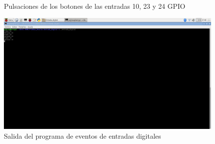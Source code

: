 \begin{itemize}
    
    \begin{figure}[htbp]
    \centering
    \caption{Pulsaciones de los botones de las entradas 10, 23 y 24 GPIO}
    \end{figure}
    
    \begin{figure}
    \centering
    \includegraphics[scale = 0.25]{anexo_a/figuras_dir/res1.jpg}
    \caption{Salida del programa de eventos de entradas digitales}
    \end{figure}




\end{itemize}
